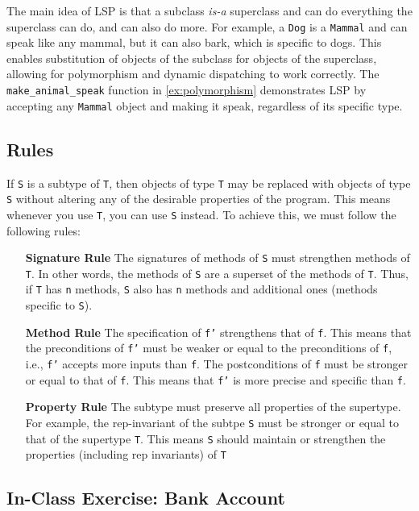 \documentclass[oneside,11pt,dvipsnames]{book}
\newcommand{\code}[1]{\texttt{#1}}
\begin{document}
The main idea of LSP is that a subclass \emph{is-a} superclass and can do everything the superclass can do, and can also do more. For example, a \code{Dog} is a \code{Mammal} and can speak like any mammal, but it can also bark, which is specific to dogs.
This enables substitution of objects of the subclass for objects of the superclass, allowing for polymorphism and dynamic dispatching to work correctly. The \code{make\_animal\_speak} function in \autoref{ex:polymorphism} demonstrates LSP by accepting any \code{Mammal} object and making it speak, regardless of its specific type.


\subsection{Rules} 
If \code{S} is a subtype of \code{T}, then objects of type \code{T} may be replaced with objects of type \code{S} without altering any of the desirable properties of the program. This means whenever you use \code{T}, you can use \code{S} instead. To achieve this, we must follow the following rules:
\begin{itemize}
\item[\textbf{Signature Rule}] The signatures of methods of \code{S} must strengthen methods of \code{T}. In other words, the methods of \code{S} are a superset of the methods of \code{T}. Thus, if \code{T} has \code{n} methods, \code{S} also has \code{n} methods and additional ones (methods specific to \code{S}). 

\item[\textbf{Method Rule}] The specification of \code{f'} strengthens that of \code{f}. This means that the preconditions of \code{f'} must be weaker or equal to the preconditions of \code{f}, i.e.,  \code{f'} accepts more inputs than \code{f}.  The postconditions of \code{f} must be stronger or equal to that of \code{f}. This means that \code{f'} is more precise and specific than \code{f}.

\item[\textbf{Property Rule}] The subtype must preserve all properties of the supertype.  For example, the rep-invariant of the subtpe \code{S} must be stronger or equal to that of the supertype \code{T}. This means \code{S} should maintain or strengthen the properties (including rep invariants) of \code{T}
\end{itemize}

\subsection{In-Class Exercise: Bank Account}
\end{document}
